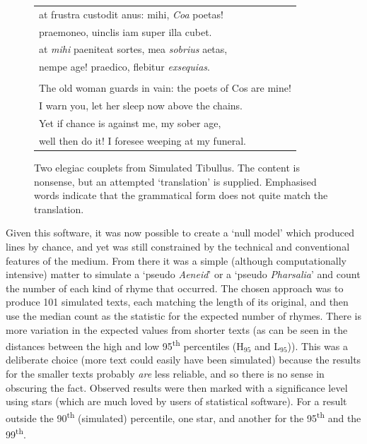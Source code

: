 \documentclass[twocolumn, switch, a4paper]{article} %
\begin{document}
\begin{figure}[h!]
\caption{
Two elegiac couplets from Simulated Tibullus. The content is nonsense, but an
attempted `translation' is supplied. Emphasised words indicate that the
grammatical form does not quite match the translation.
}
\label{fig:ps_tib}
\par\medskip
\footnotesize
\centering
\begin{tabular}{l}
at frustra custodit anus: mihi, \emph{Coa} poetas!\\
\phantom{xx} praemoneo, uinclis iam super illa cubet.\\
at \emph{mihi} paeniteat sortes, mea \emph{sobrius} aetas,\\
\phantom{xx} nempe age! praedico, flebitur \emph{exsequias}.
\\
\phantom{xxx}\\
The old woman guards in vain: the poets of Cos are mine!\\
\phantom{xx} I warn you, let her sleep now above the chains.\\
Yet if chance is against me, my sober age,\\
\phantom{xx} well then do it! I foresee weeping at my funeral.\\
\end{tabular}
\end{figure}

Given this software, it was now possible to create a `null model' which
produced lines by chance, and yet was still constrained by the technical and
conventional features of the medium. From there it was a simple (although
computationally intensive) matter to simulate a `pseudo \emph{Aeneid}' or a
`pseudo \emph{Pharsalia}' and count the number of each kind of rhyme that
occurred. The chosen approach was to produce 101 simulated texts, each
matching the length of its original, and then use the median count as the
statistic for the expected number of rhymes. There is more variation in the
expected values from shorter texts (as can be seen in the distances between
the high and low 95\textsuperscript{th} percentiles (H$_{95}$ and L$_{95}$)).
This was a deliberate choice (more text could easily have been simulated)
because the results for the smaller texts probably \emph{are} less reliable,
and so there is no sense in obscuring the fact. Observed results were then
marked with a significance level using stars (which are much loved by users of
statistical software). For a result outside the 90\textsuperscript{th}
(simulated) percentile, one star, and another for the 95\textsuperscript{th}
and the 99\textsuperscript{th}.
\end{document}
